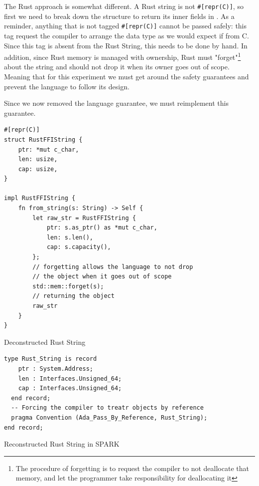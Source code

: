 \documentclass[nomenclature, english, bibtex]{kththesis}
\begin{document}
The Rust approach is somewhat different. A Rust string is not \texttt{\#[repr(C)]}, so first we need to break down the structure to return its inner fields in . As a reminder, anything that is not tagged \texttt{\#[repr(C)]} cannot be passed safely: this tag request the compiler to arrange the data type as we would expect if from C. Since this tag is absent from the Rust String, this needs to be done by hand. In addition, since Rust memory is managed with ownership, Rust must "forget"\footnote{The procedure of forgetting is to request the compiler to not deallocate that memory, and let the programmer take responsibility for deallocating it} about the string and should not drop it when its owner goes out of scope. Meaning that for this experiment we must get around the safety guarantees and prevent the language to follow its design. 

Since we now removed the language guarantee, we must reimplement this guarantee.

\begin{listing}[!ht]
\begin{verbatim}
#[repr(C)]
struct RustFFIString {
    ptr: *mut c_char,
    len: usize,
    cap: usize,
}

impl RustFFIString {
    fn from_string(s: String) -> Self {
        let raw_str = RustFFIString {
            ptr: s.as_ptr() as *mut c_char,
            len: s.len(),
            cap: s.capacity(),
        };
        // forgetting allows the language to not drop 
        // the object when it goes out of scope
        std::mem::forget(s);
        // returning the object
        raw_str
    }
}

\end{verbatim}
\caption[Deconstructed Rust String]{Deconstructed Rust String}
\label{lst:deconstructed_rust_string}
\end{listing}
\FloatBarrier

\begin{listing}[!ht]
\begin{verbatim}
type Rust_String is record
    ptr : System.Address;
    len : Interfaces.Unsigned_64;
    cap : Interfaces.Unsigned_64;
  end record;
  -- Forcing the compiler to treatr objects by reference
  pragma Convention (Ada_Pass_By_Reference, Rust_String);
end record;
\end{verbatim}
\caption[Reconstructed Rust String]{Reconstructed Rust String in SPARK}
\label{lst:reconstructed_rust_string}
\end{listing}
\FloatBarrier
\end{document}
